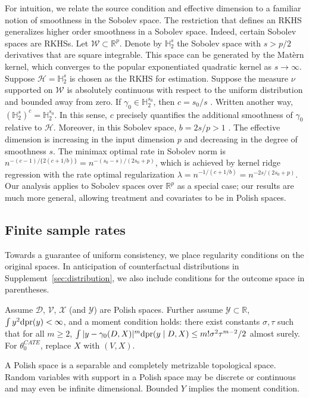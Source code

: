 For intuition, we relate the source condition and effective dimension to a familiar notion of smoothness in the Sobolev space. The restriction that defines an RKHS generalizes higher order smoothness in a Sobolev space. Indeed, certain Sobolev spaces are RKHSs. Let $\mathcal{W}\subset \mathbb{R}^p$. Denote by $\mathbb{H}_2^s$ the Sobolev space with $s>p/2$ derivatives that are square integrable. This space can be generated by the Mat\`ern kernel, which converges to the popular exponentiated quadratic kernel as $s\rightarrow \infty$. Suppose $\mathcal{H}=\mathbb{H}_2^s$ is chosen as the RKHS for estimation. Suppose the measure $\nu$ supported on $\mathcal{W}$ is absolutely continuous with respect to the uniform distribution and bounded away from zero. If $\gamma_0\in \mathbb{H}_2^{s_0}$, then $c=s_0/s$ \cite{pillaud2018statistical}. Written another way, $(\mathbb{H}_2^{s})^c=\mathbb{H}_2^{s_0}$. In this sense, $c$ precisely quantifies the additional smoothness of $\gamma_0$ relative to $\mathcal{H}$. Moreover, in this Sobolev space, $b=2s/p>1$ \cite{fischer2017sobolev}. The effective dimension is increasing in the input dimension $p$ and decreasing in the degree of smoothness $s$. The minimax optimal rate in Sobolev norm is $n^{-(c-1)/\{2(c+1/b)\}}=n^{-(s_0-s)/(2s_0+p)}$, which is achieved by kernel ridge regression with the rate optimal regularization $\lambda=n^{-1/(c+1/b)}=n^{-2s/(2s_0+p)}$. Our analysis applies to Sobolev spaces over $\mathbb{R}^p$ as a special case; our results are much more general, allowing treatment and covariates to be in Polish spaces. 

\subsection{Finite sample rates}

Towards a guarantee of uniform consistency, we place regularity conditions on the original spaces. In anticipation of counterfactual distributions in Supplement~\ref{sec:distribution}, we also include conditions for the outcome space in parentheses.
\begin{assumption}\label{assumption:original}
Assume $\mathcal{D}$, $\mathcal{V}$, $\mathcal{X}$ (and $\mathcal{Y}$) are Polish spaces. Further assume $\mathcal{Y}\subset \mathbb{R}$, $\int y^2 \mathrm{d}\text{\normalfont pr}(y)< \infty$, and a moment condition holds: there exist constants $\sigma,\tau$ such that for all $m\geq 2$, $\int |y-\gamma_0(D,X)|^m\mathrm{d}\text{\normalfont pr}(y \mid D,X)\leq m! \sigma^2 \tau^{m-2}/2$ almost surely. For $\theta_0^{CATE}$, replace $X$ with $(V,X)$.
\end{assumption}
A Polish space is a separable and completely metrizable topological space. Random variables with support in a Polish space may be discrete or continuous and may even be infinite dimensional. Bounded $Y$ implies the moment condition.

